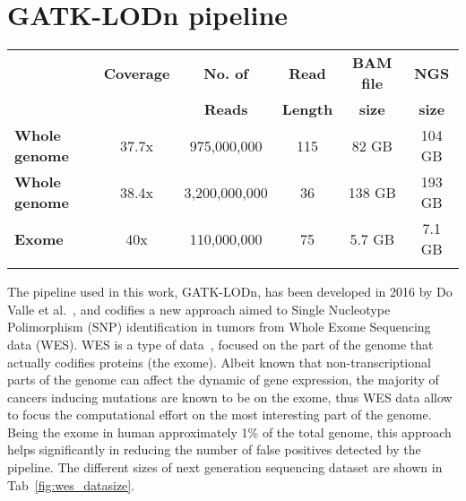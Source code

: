 \documentclass{standalone}
\begin{document}
\section*{GATK-LODn pipeline}

\begin{table*}
\centering
\begin{tabular}{lccccc}
\hline \rowcolor{darkgrayrow}
                      & \textbf{Coverage} & \textbf{No. of} & \textbf{Read}   & \textbf{BAM file} & \textbf{NGS}  \\
\rowcolor{darkgrayrow}
                      &                   & \textbf{Reads}  & \textbf{Length} & \textbf{size}     & \textbf{size} \\
\hline
\textbf{Whole genome} & 37.7x             & 975,000,000     & 115             & 82 GB             & 104 GB        \\

\textbf{Whole genome} & 38.4x             & 3,200,000,000   & 36              & 138 GB            & 193 GB        \\

\textbf{Exome}        & 40x               & 110,000,000     & 75              & 5.7 GB            & 7.1 GB        \\
\hline\\
\end{tabular}
\caption{Typical dataset size for a single patient of different types of next generation sequencing.
BAM file size refers to the size of the binary file containing the reads from the machine.}
\label{fig:wes_datasize}
\end{table*}

The pipeline used in this work, GATK-LODn, has been developed in 2016 by Do Valle et al.~\cite{DoValle2016}, and codifies a new approach aimed to Single Nucleotype Polimorphism (SNP) identification in tumors from Whole Exome Sequencing data (WES).
WES is a type of  data~\cite{Zwolak2008, Behjati2013, Shendure2008}, focused on the part of the genome that actually codifies proteins (the exome).
Albeit known that non-transcriptional parts of the genome can affect the dynamic of gene expression, the majority of cancers inducing mutations are known to be on the exome, thus WES data allow to focus the computational effort on the most interesting part of the genome.
Being the exome in human approximately 1\% of the total genome, this approach helps significantly in reducing the number of false positives detected by the pipeline.
The different sizes of next generation sequencing dataset are shown in Tab~\ref{fig:wes_datasize}.
\end{document}
